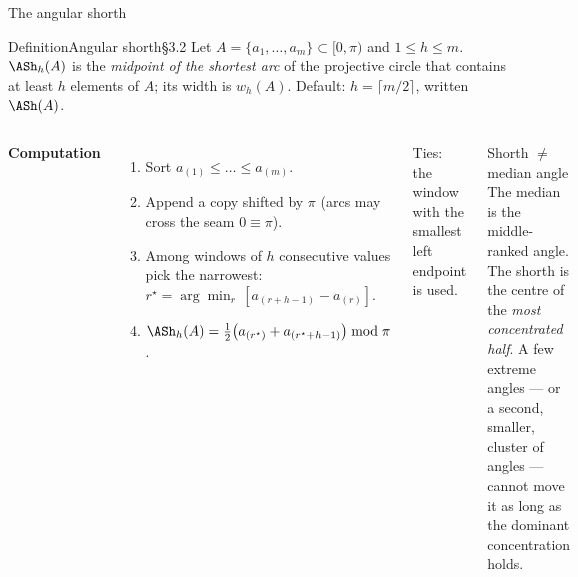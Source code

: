 \documentclass[aspectratio=169,9pt]{beamer}
\begin{document}
\begin{frame}{The angular shorth}
\begin{rdef}{Definition}{Angular shorth}{\S3.2}
Let $A=\{a_1,\dots,a_m\}\subset[0,\pi)$ and $1\le h\le m$. $\ASh_h(A)$ is the \emph{midpoint of the shortest arc} of the projective circle that contains at least $h$ elements of $A$; its width is $w_h(A)$. Default: $h=\lceil m/2\rceil$, written $\ASh(A)$.
\end{rdef}
\begin{columns}[T]
\textbf{Computation} 
\begin{enumerate}\setlength\itemsep{1pt}\small
\item Sort $a_{(1)}\le\dots\le a_{(m)}$.
\item Append a copy shifted by $\pi$ (arcs may cross the seam $0\equiv\pi$).
\item Among windows of $h$ consecutive values pick the narrowest: $r^\star=\arg\min_r\,[a_{(r+h-1)}-a_{(r)}]$.
\item $\ASh_h(A)=\tfrac12\big(a_{(r^\star)}+a_{(r^\star+h-1)}\big)\bmod\pi$.
\end{enumerate}
{\small Ties: the window with the smallest left endpoint is used.}
\begin{rkey}{Shorth $\neq$ median angle}
The median is the middle-ranked angle. The shorth is the centre of the \emph{most concentrated half}. A few extreme angles --- or a second, smaller, cluster of angles --- cannot move it as long as the dominant concentration holds.
\end{rkey}
\end{columns}
\end{frame}
\end{document}
